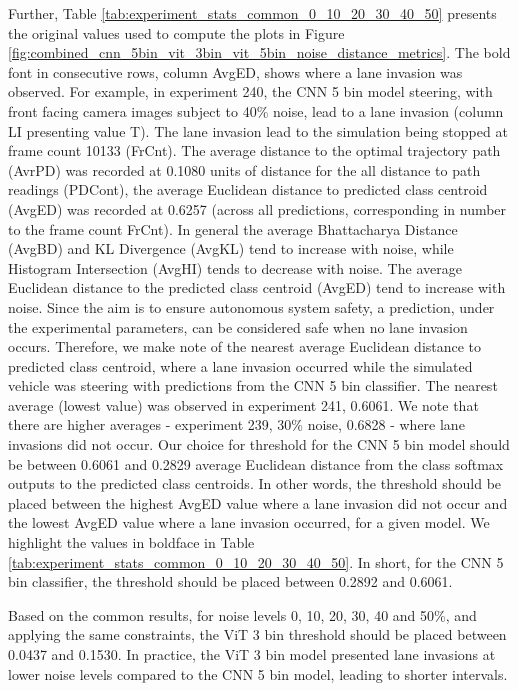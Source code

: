Further, Table \ref{tab:experiment_stats_common_0_10_20_30_40_50} presents the original values used to compute the plots in Figure \ref{fig:combined_cnn_5bin_vit_3bin_vit_5bin_noise_distance_metrics}. The bold font in consecutive rows, column AvgED, shows where a lane invasion was observed. For example, in experiment 240, the CNN 5 bin model steering, with front facing camera images subject to 40\% noise, lead to a lane invasion (column LI presenting value T). The lane invasion lead to the simulation being stopped at frame count 10133 (FrCnt). The average distance to the optimal trajectory path (AvrPD) was recorded at 0.1080 units of distance for the all distance to path readings (PDCont), the average Euclidean distance to predicted class centroid (AvgED) was recorded at 0.6257 (across all predictions, corresponding in number to the frame count FrCnt). In general the average Bhattacharya Distance (AvgBD) and KL Divergence (AvgKL) tend to increase with noise, while Histogram Intersection (AvgHI) tends to decrease with noise.
The average Euclidean distance to the predicted class centroid (AvgED) tend to increase with noise. 
Since the aim is to ensure autonomous system safety, a prediction, under the experimental parameters, can be considered safe when no lane invasion occurs. Therefore, we make note of the nearest average Euclidean distance to predicted class centroid, where a lane invasion occurred while the simulated vehicle was steering with predictions from the CNN 5 bin classifier. The nearest average (lowest value) was observed in experiment 241, 0.6061. We note that there are higher averages - experiment 239, 30\% noise, 0.6828 - where lane invasions did not occur. Our choice for threshold for the CNN 5 bin model should be between 0.6061 and 0.2829 average Euclidean distance from the class softmax outputs to the predicted class centroids. In other words, the threshold should be placed between the highest AvgED value where a lane invasion did not occur and the lowest AvgED value where a lane invasion occurred, for a given model. We highlight the values in boldface in Table \ref{tab:experiment_stats_common_0_10_20_30_40_50}. In short, for the CNN 5 bin classifier, the threshold should be placed between 0.2892 and 0.6061. 

Based on the common results, for noise levels 0, 10, 20, 30, 40 and 50\%, and applying the same constraints, the ViT 3 bin threshold should be placed between 0.0437 and 0.1530. In practice, the ViT 3 bin model presented lane invasions at lower noise levels compared to the CNN 5 bin model, leading to shorter intervals. 

